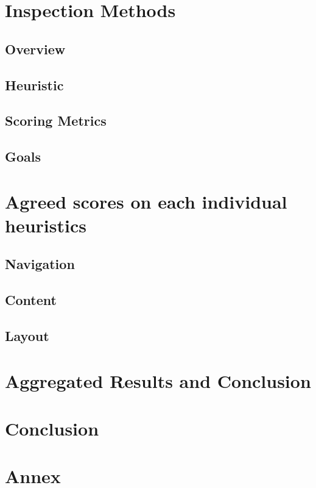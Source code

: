 \documentclass[11pt, a4paperm, hidelinks]{article}
\begin{document}
	\section{Inspection Methods}

	\subsection{Overview}
	

	\subsection{Heuristic}
	

	\subsection{Scoring Metrics}
	

	\subsection{Goals}
	
	\clearpage


	\section{Agreed scores on each individual heuristics}

	\subsection{Navigation}
	

	\subsection{Content}
	

	\subsection{Layout}
	
	\clearpage


	\section{Aggregated Results and Conclusion}
	
	\clearpage

	\section{Conclusion}
	\clearpage

	\appendix
	\section{Annex}
	
\end{document}
